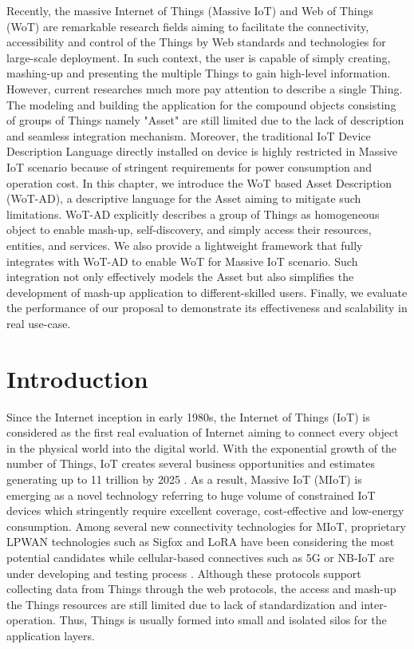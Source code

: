 Recently, the massive Internet of Things (Massive IoT) and Web of Things (WoT) are remarkable research fields aiming to facilitate the connectivity, accessibility and control of the Things by Web standards and technologies for large-scale deployment. In such context, the user is capable of simply creating, mashing-up and presenting the multiple Things to gain high-level information. However, current researches much more pay attention to describe a single Thing. The modeling and building the application for the compound objects consisting of groups of Things namely "Asset" are still limited due to the lack of description and seamless integration mechanism. Moreover, the traditional IoT Device Description Language directly installed on device is highly restricted in Massive IoT scenario because of stringent requirements for power consumption and operation cost.   
In this chapter, we introduce the WoT based Asset Description (WoT-AD), a descriptive language for the Asset aiming to mitigate such limitations. WoT-AD explicitly describes a group of Things as homogeneous object to enable mash-up, self-discovery, and simply access their resources, entities, and services. We also provide a lightweight framework that fully integrates with WoT-AD to enable WoT for Massive IoT scenario. Such integration not only effectively models the Asset but also simplifies the development of mash-up application to different-skilled users. Finally, we evaluate the performance of our proposal to demonstrate its effectiveness and scalability in real use-case.

\section{Introduction}
Since the Internet inception in early 1980s, the Internet of Things (IoT) is considered as the first real evaluation of Internet \cite{lee2015internet} aiming to connect every object in the physical world into the digital world. With the exponential growth of the number of Things, IoT creates several business opportunities and estimates generating up to 11 trillion by 2025 \cite{manyika2015unlocking}. As a result, Massive IoT (MIoT)	is emerging	as a novel technology referring to huge volume of constrained IoT devices which stringently require excellent coverage, cost-effective and low-energy consumption. Among several new connectivity technologies for MIoT, proprietary LPWAN technologies such as Sigfox and LoRA have been considering the most potential candidates while cellular-based connectives such as 5G or NB-IoT are under developing and testing process \cite{raza2017low}. Although these protocols support collecting data from Things through the web protocols, the access and mash-up the Things resources are still limited due to lack of standardization and inter-operation. Thus, Things is usually formed into small and isolated silos for the application layers. \\

